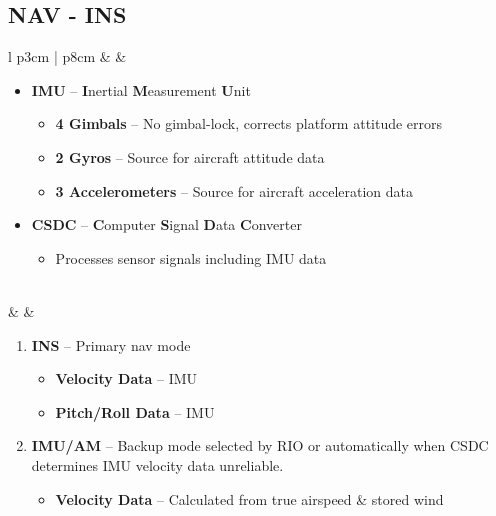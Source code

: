 \documentclass[10pt,usenames,dvipsnames,twoside]{report}
\begin{document}
	\subsection{NAV - INS}
	\begin{center}
		\begin{longtable}{l p{3cm} | p{8cm}}
			\toprule
			\textbullet &  &
			\begin{minipage}[t]{\linewidth}
				\vspace{-7pt}
				\begin{itemize}
					\item \textbf{IMU} -- \textbf{I}nertial \textbf{M}easurement \textbf{U}nit
					\begin{itemize}
						\item \textbf{4 Gimbals} -- No gimbal-lock, corrects platform attitude errors
						\item \textbf{2 Gyros} -- Source for aircraft attitude data
						\item \textbf{3 Accelerometers} -- Source for aircraft acceleration data
					\end{itemize}
					\item \textbf{CSDC} -- \textbf{C}omputer \textbf{S}ignal \textbf{D}ata \textbf{C}onverter
					\begin{itemize}
						\item Processes sensor signals including IMU data
					\end{itemize}
				\end{itemize}
			\end{minipage} \\
			\midrule
			\textbullet &  &
			\begin{minipage}[t]{\linewidth}
				\vspace{-7pt}
				\begin{enumerate}
					\item \textbf{INS} -- Primary nav mode
					\begin{itemize}
						\item \textbf{Velocity Data} -- IMU
						\item \textbf{Pitch/Roll Data} -- IMU
					\end{itemize}
					\item \textbf{IMU/AM} -- Backup mode selected by RIO or automatically when CSDC determines IMU velocity data unreliable.
					\begin{itemize}
						\item \textbf{Velocity Data} -- Calculated from true airspeed \&  stored wind

\end{itemize}
\end{enumerate}
\end{minipage}
\end{longtable}
\end{center}
\end{document}
